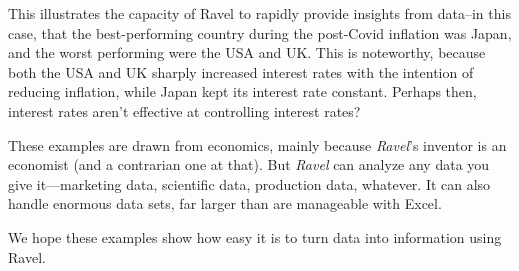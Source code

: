 This illustrates the capacity of Ravel to rapidly provide insights
from data--in this case, that the best-performing country during
the post-Covid inflation was Japan, and the worst performing were
the USA and UK. This is noteworthy, because both the USA and UK sharply
increased interest rates with the intention of reducing inflation,
while Japan kept its interest rate constant. Perhaps then, interest
rates aren't effective at controlling interest rates? 

These examples are drawn from economics, mainly because \emph{Ravel}'s
inventor is an economist (and a contrarian one at that). But \emph{Ravel}
can analyze any data you give it---marketing data, scientific data,
production data, whatever. It can also handle enormous data sets,
far larger than are manageable with Excel.

We hope these examples show how easy it is to turn data into information
using Ravel.
